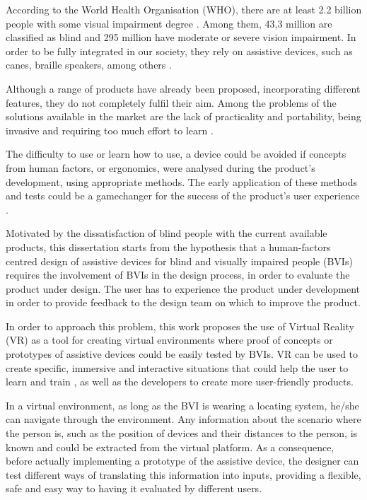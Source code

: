 

According to the World Health Organisation (WHO), there are at least 2.2 billion people with some visual impairment degree \cite{world2019world}. Among them, 43,3 million are classified as blind and 295 million have moderate or severe vision impairment. In order to be fully integrated in our society, they rely on assistive devices, such as canes, braille speakers, among others \cite{bourne2021trends}. 

Although a range of products have already been proposed, incorporating different features, they do not completely fulfil their aim. Among the problems of the solutions available in the market are the lack of practicality and portability, being invasive and requiring too much effort to learn \cite{lozano2009electrotactile}.

The difficulty to use or learn how to use, a device could be avoided if concepts from human factors, or ergonomics, were analysed during the product’s development, using appropriate methods. The early application of these methods and tests could be a gamechanger for the success of the product's user experience \cite{wolf2019towards}.

Motivated by the dissatisfaction of blind people with the current available products, this dissertation starts from the hypothesis that a human-factors centred design of assistive devices for blind and visually impaired people (BVIs) requires the involvement of BVIs in the design process, in order to evaluate the product under design. The user has to experience the product under development in order to provide feedback to the design team on which to improve the product.

In order to approach this problem, this work proposes the use of Virtual Reality (VR) as a tool for creating virtual environments where proof of concepts or prototypes of assistive devices could be easily tested by BVIs. VR can be used to create specific, immersive and interactive situations that could help the user to learn and train \cite{farrell2018learning}, as well as the developers to create more user-friendly products.

In a virtual environment, as long as the BVI is wearing a locating system, he/she can navigate through the environment. Any information about the scenario where the person is, such as the position of devices and their distances to the person, is known and could be extracted from the virtual platform. As a consequence, before actually implementing a prototype of the assistive device, the designer can test different ways of translating this information into inputs, providing a flexible, safe and easy way to having it evaluated by different users.

